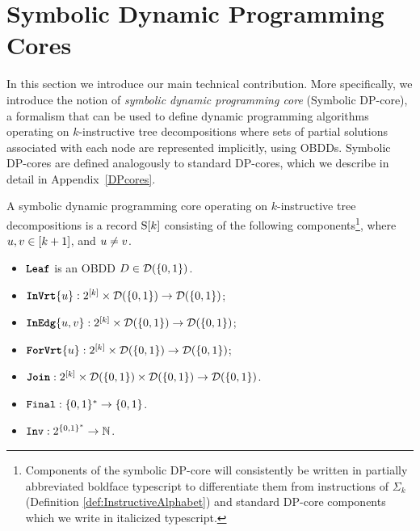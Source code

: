 \section{Symbolic Dynamic Programming Cores}
\label{SymbolicDPCores}

In this section we introduce our main technical contribution. More specifically, we introduce the notion of \emph{symbolic dynamic programming core} (Symbolic DP-core), a formalism that can be used to define dynamic programming algorithms operating on $k$-instructive tree decompositions where sets of partial solutions associated with each node are represented implicitly, using OBDDs. Symbolic DP-cores are defined analogously to standard DP-cores, which we describe in detail in Appendix~\ref{DPcores}.

A symbolic dynamic programming core  operating on $k$-instructive tree decompositions is a record $\mathrm{S}[k]$ consisting of the following components\footnote{Components of the symbolic DP-core will consistently be written in partially abbreviated boldface typescript to differentiate them from instructions of $\Sigma_k$ (Definition \ref{def:InstructiveAlphabet}) and standard DP-core components which we write in italicized typescript.}, where $u,v \in [k+1]$, and 
$u\neq v$. 

\begin{itemize}
    \item $\texttt{\textbf{Leaf}}$ is an OBDD $D\in \mathcal{D}(\{0,1\})$. 
    \item $\texttt{\textbf{InVrt}}\{u\}:2^{[k]}\times  
    \mathcal{D}(\{0,1\})\rightarrow \mathcal{D}(\{0,1\})$;
    \item $\texttt{\textbf{InEdg}}\{u,v\}:2^{[k]}\times\mathcal{D}(\{0,1\})\rightarrow \mathcal{D}(\{0,1\})$;
    \item $\texttt{\textbf{ForVrt}}\{u\}:2^{[k]}\times \mathcal{D}(\{0,1\})\rightarrow \mathcal{D}(\{0,1\})$;
    \item $\texttt{\textbf{Join}}:2^{[k]}\times \mathcal{D}(\{0,1\})\times 
    \mathcal{D}(\{0,1\})
    \rightarrow 
    \mathcal{D}(\{0,1\})$.
    \item $\texttt{Final}:\{0,1\}^*\rightarrow \{0,1\}$. 
    \item $\texttt{Inv}:2^{\{0,1\}^*}\rightarrow \mathbb{N}$. 
\end{itemize}


